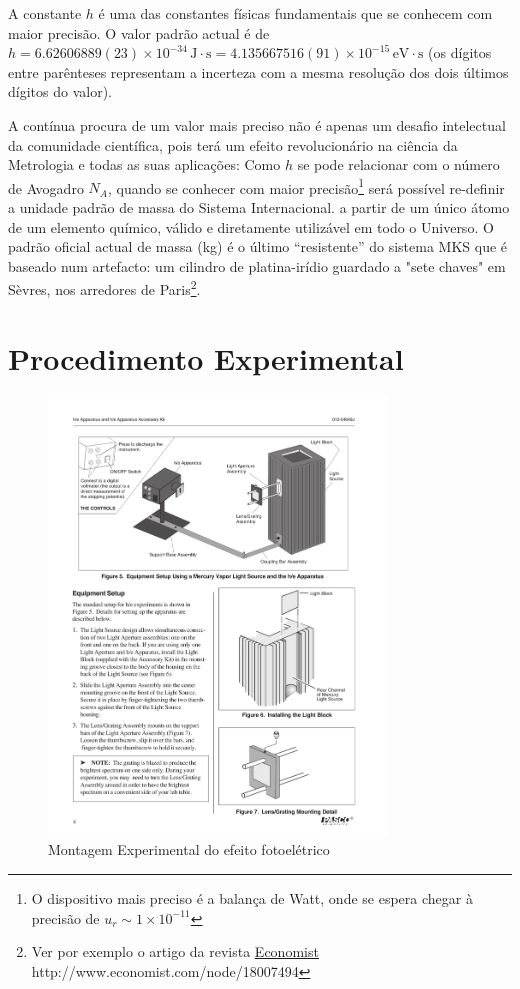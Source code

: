 \documentclass[a4paper,12pt]{article}  %
\begin{document}
A constante $h$ é uma das constantes físicas fundamentais que se conhecem com maior precisão.
O valor padrão actual é de $h=6.62606889(23) \times 10^{-34}\,\textrm{J}\cdot \textrm{s}=4.135667516(91)\times 10^{-15}\,\textrm{eV}\cdot\textrm{s}$ (os  dígitos entre parênteses representam a incerteza com a mesma resolução dos dois últimos dígitos do valor). 

A contínua procura de um valor mais preciso não é apenas um  desafio intelectual da comunidade científica, pois
 terá um efeito  revolucionário na ciência da Metrologia e todas as suas aplicações: 
 Como $h$ se pode relacionar com o número de Avogadro  $N_A$, quando se conhecer com maior precisão\footnote{O dispositivo mais preciso é a balança de Watt, onde se espera chegar à precisão de $u_r \sim 1\times 10^{-11}$} será possível re-definir a unidade padrão de massa do Sistema Internacional. a partir de um único átomo de um elemento químico, válido e diretamente utilizável em todo o Universo. 
 O padrão oficial actual de massa (kg) é o último ``resistente''  do sistema MKS que é baseado num artefacto: um cilindro de platina-irídio guardado a "sete chaves" em Sèvres, nos arredores de Paris\footnote{Ver por exemplo o artigo da revista \href{http://www.economist.com/node/18007494}{Economist} http://www.economist.com/node/18007494}.   
 
\section{\sf Procedimento Experimental}

\begin{figure}[htb] 
	\centering 
	\includegraphics[width=0.8\textwidth]{planckPasco} 
	\caption{Montagem Experimental do efeito fotoelétrico} 
	\label{fig:plackPasco}
\end{figure}
\end{document}
